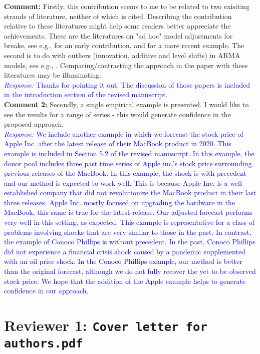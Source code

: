 \documentclass[12pt]{article}
\newcommand{\response}[1]{\noindent \textcolor{blue}{\emph{Response:} #1}}
\begin{document}
{\bf Comment:} Firstly, this contribution seems to me to be related to two exisiting strands of literature, neither of which is cited. Describing the contribution relative to these literatures might help some readers better appreciate the achievements.
These are the literatures on "ad hoc" model adjustments for breaks, see e.g.,  \cite{clements1996intercept} for an early contribution, and \cite{castle2015robust} for a more recent example. The second is to do with outliers (innovation, additive and level shifts) in ARMA models, see e.g., \cite{tsay1986time}. Comparing/contrasting the approach in the paper with these literatures may be illuminating. \\

\response{Thanks for pointing it out. The discussion of those papers is included in the introduction section of the revised manuscript.}\\

{\bf Comment 2:} Secondly, a single empirical example is presented. I would like to see the results for a range of series - this would generate confidence in the proposed approach. \\

\response{We include another example in which we forecast the stock price of Apple Inc. after the latest release of their MacBook product in 2020. This example is included in Section 5.2 of the revised manuscript. In this example, the donor pool includes three past time series of  Apple inc.'s stock price surrounding previous releases of the MacBook. In this example, the shock is with precedent and our method is expected to work well. This is because Apple Inc. is a well-established company that did not revolutionize the MacBook product in their last three releases. Apple Inc. mostly focused on upgrading the hardware in the MacBook, this same is true for the latest release. Our adjusted forecast performs very well in this setting, as expected. This example is representative for a class of problems involving shocks that are very similar to those in the past. In contrast, the example of Conoco Phillips is without precedent. In the past, Conoco Phillips  did not experience a financial crisis shock caused by a pandemic supplemented with an oil price shock. In the Conoco Phillips example, our method is better than the original forecast, although we do not fully recover the yet to be observed stock price. We hope that the addition of the Apple example helps to generate confidence in our approach.}

\newpage
\section*{Reviewer 1: \texttt{Cover letter for authors.pdf}}
\end{document}
